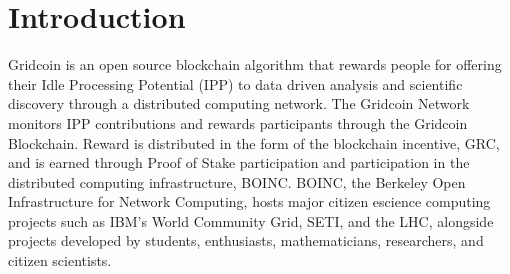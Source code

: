 \section{Introduction}

\label{sec:intro}

Gridcoin is an open source blockchain algorithm that rewards people for offering their Idle Processing Potential (IPP) to data driven analysis and scientific discovery through a distributed computing network.  The Gridcoin Network monitors IPP contributions and rewards participants through the Gridcoin Blockchain.  Reward is distributed in the form of the blockchain incentive, GRC, and is earned through Proof of Stake participation and participation in the distributed computing infrastructure, BOINC.  BOINC, the Berkeley Open Infrastructure for Network Computing, hosts major citizen escience computing projects such as IBM’s World Community Grid, SETI, and the LHC, alongside projects developed by students, enthusiasts, mathematicians, researchers, and citizen scientists.
